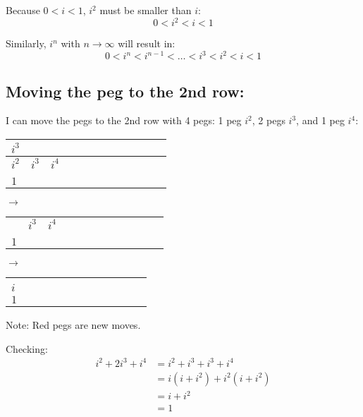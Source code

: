 \documentclass[12pt]{article}
\begin{document}
\begin{itemize}
    \noindent Because $0<i<1$, $i^2$ must be smaller than $i$:
    $$0<i^2<i<1$$

    \noindent Similarly, $i^n$ with $n\to \infty$ will result in:
    $$0<i^n<i^{n-1}<\dots<i^3<i^2<i<1$$
\end{itemize}

\vspace{1cm}

\subsection*{Moving the peg to the 2nd row:}

\noindent I can move the pegs to the 2nd row with 4 pegs: 1 peg $i^2$, 2 pegs $i^3$, and 1 peg $i^4$:

\begin{center}
\begin{tabular}{|l|c|c|c|c|c|c|c|c|c|c|r|}
    \hline
    $i^3$ &  & \\
    \hline
    $i^2$ & $i^3$ & $i^4$  \\
    \hline
    &  &  \\
    \hline
    $1$ &  &  \\
    \hline
\end{tabular}
$\longrightarrow$
\begin{tabular}{|l|c|c|c|c|c|c|c|c|c|c|r|}
    \hline
    &  & \\
    \hline
    & $i^3$ & $i^4$  \\
    \hline
    \color{red}{$i$} &  &  \\
    \hline
    $1$ &  &  \\
    \hline
\end{tabular}
$\longrightarrow$
\begin{tabular}{|l|c|c|c|c|c|c|c|c|c|c|r|}
    \hline
    \\
    \hline
    \color{red}{$i^2$} \\
    \hline
    $i$ \\
    \hline
    $1$ \\
    \hline
\end{tabular}

\noindent *Note: Red pegs are new moves.
\end{center}


\noindent Checking:
\begin{align*}
    i^2+2i^3+i^4 &= i^2+i^3+i^3+i^4\\
    &= i \left(i+i^2 \right)+i^2 \left(i+i^2 \right)\\
    &=i+ i^2\\
    &= 1
\end{align*}
\end{document}
